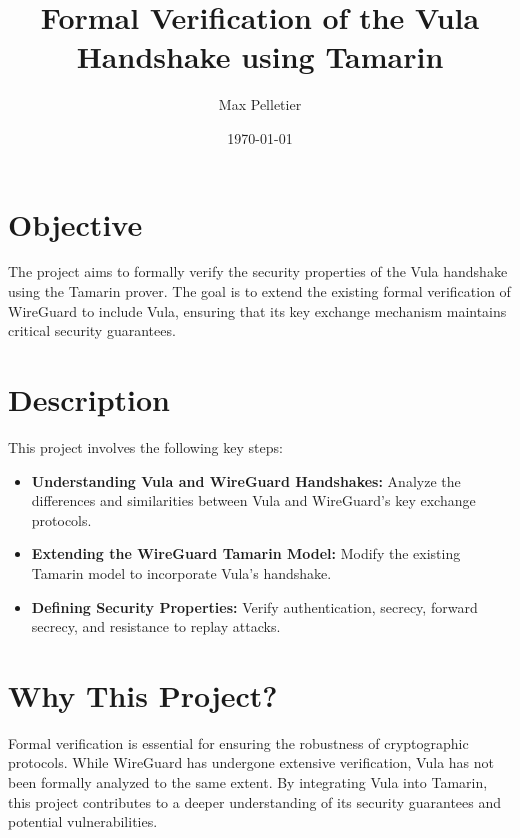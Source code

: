 \documentclass[a4paper,12pt]{article}
\title{\textbf{Formal Verification of the Vula Handshake using Tamarin}}
\author{Max Pelletier}
\date{\today}
\begin{document}
\maketitle

\section*{Objective}
The project aims to formally verify the security properties of the Vula handshake using the Tamarin prover. The goal is to extend the existing formal verification of WireGuard to include Vula, ensuring that its key exchange mechanism maintains critical security guarantees.

\section*{Description}
This project involves the following key steps:
\begin{itemize}
    \item \textbf{Understanding Vula and WireGuard Handshakes:} Analyze the differences and similarities between Vula and WireGuard's key exchange protocols.
	    \item \textbf{Extending the WireGuard Tamarin Model:} Modify the existing Tamarin model to incorporate Vula’s handshake.
    \item \textbf{Defining Security Properties:} Verify authentication, secrecy, forward secrecy, and resistance to replay attacks.
\end{itemize}

\section*{Why This Project?}
Formal verification is essential for ensuring the robustness of cryptographic protocols. While WireGuard has undergone extensive verification, Vula has not been formally analyzed to the same extent. By integrating Vula into Tamarin, this project contributes to a deeper understanding of its security guarantees and potential vulnerabilities.
\end{document}
